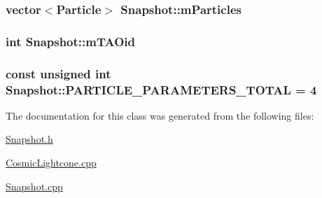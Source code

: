 \subsubsection[{m\+Particles}]{\setlength{\rightskip}{0pt plus 5cm}vector$<${\bf Particle}$>$ Snapshot\+::m\+Particles}\label{classSnapshot_a96ba382e41a4fa8bd4de0e3e999be8f1}
\hypertarget{classSnapshot_a819b00f164775a0ec42023903ebb20ee}{}
\subsubsection[{m\+T\+A\+Oid}]{\setlength{\rightskip}{0pt plus 5cm}int Snapshot\+::m\+T\+A\+Oid}\label{classSnapshot_a819b00f164775a0ec42023903ebb20ee}
\hypertarget{classSnapshot_a651f859c63b47954020a0c08340892cc}{}
\subsubsection[{P\+A\+R\+T\+I\+C\+L\+E\+\_\+\+P\+A\+R\+A\+M\+E\+T\+E\+R\+S\+\_\+\+T\+O\+T\+A\+L}]{\setlength{\rightskip}{0pt plus 5cm}const unsigned int Snapshot\+::\+P\+A\+R\+T\+I\+C\+L\+E\+\_\+\+P\+A\+R\+A\+M\+E\+T\+E\+R\+S\+\_\+\+T\+O\+T\+A\+L = 4\hspace{0.3cm}{\ttfamily [static]}}\label{classSnapshot_a651f859c63b47954020a0c08340892cc}


The documentation for this class was generated from the following files\+:\begin{DoxyCompactItemize}
\item 
\hyperlink{Snapshot_8h}{Snapshot.\+h}\item 
\hyperlink{CosmicLightcone_8cpp}{Cosmic\+Lightcone.\+cpp}\item 
\hyperlink{Snapshot_8cpp}{Snapshot.\+cpp}\end{DoxyCompactItemize}

